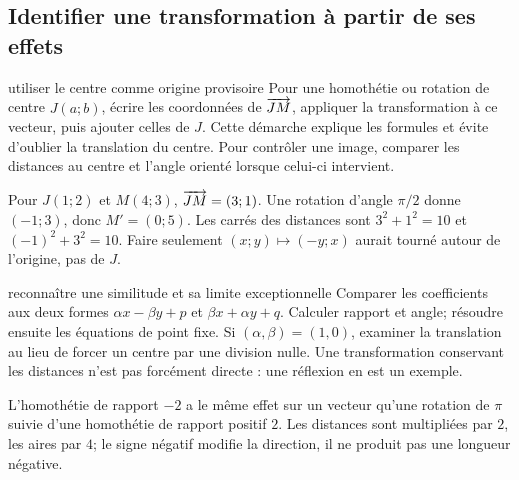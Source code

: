 \subsection*{Identifier une transformation à partir de ses effets}
\begin{methode}{utiliser le centre comme origine provisoire}
Pour une homothétie ou rotation de centre $J(a;b)$, écrire les coordonnées de $\overrightarrow{JM}$, appliquer la transformation à ce vecteur, puis ajouter celles de $J$. Cette démarche explique les formules et évite d’oublier la translation du centre. Pour contrôler une image, comparer les distances au centre et l’angle orienté lorsque celui-ci intervient.
\end{methode}
\begin{exemple}
Pour $J(1;2)$ et $M(4;3)$, $\overrightarrow{JM}=(3;1)$. Une rotation d’angle $\pi/2$ donne $(-1;3)$, donc $M'=(0;5)$. Les carrés des distances sont $3^2+1^2=10$ et $(-1)^2+3^2=10$. Faire seulement $(x;y)\mapsto(-y;x)$ aurait tourné autour de l’origine, pas de $J$.
\end{exemple}
\begin{methode}{reconnaître une similitude et sa limite exceptionnelle}
Comparer les coefficients aux deux formes $\alpha x-\beta y+p$ et $\beta x+\alpha y+q$. Calculer rapport et angle; résoudre ensuite les équations de point fixe. Si $(\alpha,\beta)=(1,0)$, examiner la translation au lieu de forcer un centre par une division nulle. Une transformation conservant les distances n’est pas forcément directe : une réflexion en est un exemple.
\end{methode}
\begin{exemple}
L’homothétie de rapport $-2$ a le même effet sur un vecteur qu’une rotation de $\pi$ suivie d’une homothétie de rapport positif $2$. Les distances sont multipliées par $2$, les aires par $4$; le signe négatif modifie la direction, il ne produit pas une longueur négative.
\end{exemple}

